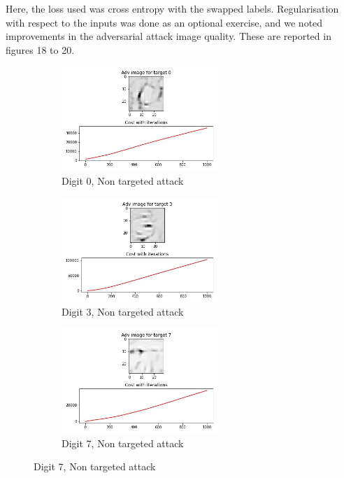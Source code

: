 Here, the loss used was cross entropy with the swapped labels. Regularisation with respect to the inputs was done as an optional exercise, and we noted improvements in the adversarial attack image quality. These are reported in figures 18 to 20.

\begin{figure}[!htbp]
\begin{subfigure}
\centering
\includegraphics[angle=0,width=0.65\textwidth]{assign-2/logs/adv/non/adv-0.jpg}
\caption{Digit 0, Non targeted attack}
\end{subfigure}
\begin{subfigure}
\centering
\includegraphics[angle=0,width=0.65\textwidth]{assign-2/logs/adv/non/adv-3.jpg}
\caption{Digit 3, Non targeted attack}
\end{subfigure}
\begin{subfigure}
\centering
\includegraphics[angle=0,width=0.65\textwidth]{assign-2/logs/adv/non/adv-7.jpg}
\caption{Digit 7, Non targeted attack} 
\end{subfigure}
\end{figure}

